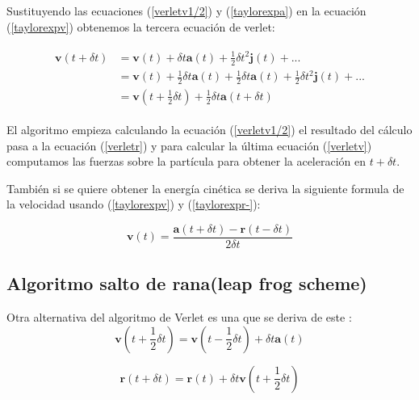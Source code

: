 Sustituyendo las ecuaciones (\ref{verletv1/2}) y (\ref{taylorexpa}) en la ecuación (\ref{taylorexpv}) obtenemos la tercera ecuación de verlet:

\begin{align} \label{verletv}
\begin{split}
    \mathbf{v}(t + \delta t) &= \mathbf{v}(t)+\delta t\mathbf{a}(t) + \frac{1}{2}\delta t^2 \mathbf{j}(t)+...\\
                             &= \mathbf{v}(t)+\frac{1}{2}\delta t\mathbf{a}(t) + \frac{1}{2}\delta t\mathbf{a}(t)+ \frac{1}{2}\delta t^2 \mathbf{j}(t)+...\\
                             &= \mathbf{v}(t + \frac{1}{2}\delta t) + \frac{1}{2}\delta t\mathbf{a}(t + \delta t)
\end{split}
\end{align}

El algoritmo empieza calculando la ecuación (\ref{verletv1/2}) el resultado del cálculo pasa a la ecuación (\ref{verletr}) y para calcular la última ecuación (\ref{verletv}) computamos las fuerzas sobre la partícula para obtener la aceleración en $t + \delta t$.

También si se quiere obtener la energía cinética se deriva la siguiente formula de la velocidad usando (\ref{taylorexpv}) y (\ref{taylorexpr-}):

\begin{equation}
    \mathbf{v}(t)=\frac{\mathbf{a}(t + \delta t)-\mathbf{r}(t - \delta t)}{2\delta t}
\end{equation}

\subsection{Algoritmo salto de rana(leap frog scheme)}

Otra alternativa del algoritmo de Verlet es una que se deriva de este \cite{Allen2017}:\\

\begin{equation} \label{leapfrogv1/2}
    \mathbf{v}(t + \frac{1}{2}\delta t)=\mathbf{v}(t - \frac{1}{2}\delta t)+\delta t\mathbf{a}(t)
\end{equation}

\begin{equation} \label{leapfrogr}
    \mathbf{r}(t + \delta t)= \mathbf{r}(t)+\delta t \mathbf{v}(t+\frac{1}{2}\delta t)
\end{equation}

